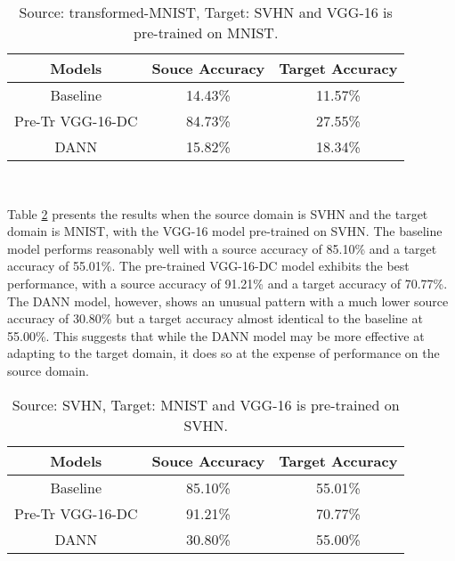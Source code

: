 \documentclass[conference]{IEEEtran}
\begin{document}
\begin{table}[h!]
  \centering
  \begin{tabular}{c c c}
  \hline
    Models & Souce Accuracy & Target Accuracy \\ 
    \hline \hline
    Baseline & 14.43\% & 11.57\% \\  
    Pre-Tr VGG-16-DC & 84.73\% & 27.55\% \\
    DANN & 15.82\% & 18.34\% \\
    \hline
  \end{tabular} \\ [1ex]
  \caption{Source: transformed-MNIST, Target: SVHN and VGG-16 is pre-trained on MNIST.}
  \label{tab:trmnist_svhn}
\end{table}

Table \ref{tab:svhn_mnist} presents the results when the source domain is SVHN and the target domain is MNIST, with the VGG-16 model pre-trained on SVHN. The baseline model performs reasonably well with a source accuracy of 85.10\% and a target accuracy of 55.01\%. The pre-trained VGG-16-DC model exhibits the best performance, with a source accuracy of 91.21\% and a target accuracy of 70.77\%. The DANN model, however, shows an unusual pattern with a much lower source accuracy of 30.80\% but a target accuracy almost identical to the baseline at 55.00\%. This suggests that while the DANN model may be more effective at adapting to the target domain, it does so at the expense of performance on the source domain.

\begin{table}[h!]
  \centering
  \begin{tabular}{||c c c||}
  \hline
    Models & Souce Accuracy & Target Accuracy \\ 
    \hline \hline
    Baseline & 85.10\% & 55.01\% \\  
    Pre-Tr VGG-16-DC & 91.21\% & 70.77\% \\
    DANN & 30.80\% & 55.00\% \\
    \hline
  \end{tabular} \\ [1ex]
  \caption{Source: SVHN, Target: MNIST and VGG-16 is pre-trained on SVHN.}
  \label{tab:svhn_mnist}
\end{table}
\end{document}

